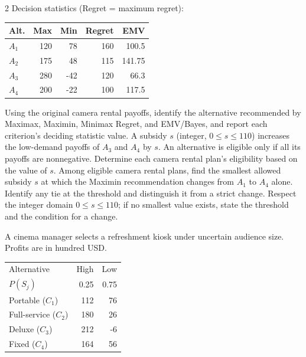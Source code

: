\begin{multicols}{2}
Decision statistics (Regret = maximum regret):

\vspace{-4mm}
\begin{center}\small\setlength{\tabcolsep}{4pt}
	\begin{tabular}{lrrrr}\toprule
		Alt. & Max & Min & Regret & EMV\\ \midrule
				$A_1$ & 120 & 78 & 160 & 100.5\\
		$A_2$ & 175 & 48 & 115 & 141.75\\
		$A_3$ & 280 & -42 & 120 & 66.3\\
		$A_4$ & 200 & -22 & 100 & 117.5\\
		\bottomrule
	\end{tabular}
\end{center}
\vspace{-4mm}

\noindent Using the original camera rental payoffs, identify the alternative recommended by Maximax, Maximin, Minimax Regret, and EMV/Bayes, and report each criterion's deciding statistic value.  A subsidy $s$ (integer, $0\leq s\leq110$) increases the low-demand payoffs of $A_3$ and $A_4$ by $s$. An alternative is eligible only if all its payoffs are nonnegative. Determine each camera rental plan's eligibility based on the value of $s$.  Among eligible camera rental plans, find the smallest allowed subsidy $s$ at which the Maximin recommendation changes from $A_1$ to $A_4$ alone. Identify any tie at the threshold and distinguish it from a strict change. Respect the integer domain $0\leq s\leq110$; if no smallest value exists, state the threshold and the condition for a change. 


A cinema manager selects a refreshment kiosk under uncertain audience size. Profits are in hundred USD. \vspace{-3mm}

\begin{center}\small\setlength{\tabcolsep}{4pt}
	\begin{tabular}{lrr}\toprule
		Alternative & High & Low\\
		$P(S_j)$ & 0.25 & 0.75\\ \midrule
				Portable ($C_1$) & 112 & 76\\
		Full-service ($C_2$) & 180 & 26\\
		Deluxe ($C_3$) & 212 & -6\\
		Fixed ($C_4$) & 164 & 56\\
		\bottomrule
	\end{tabular}
\end{center} \vspace{-4mm}


\end{multicols}
